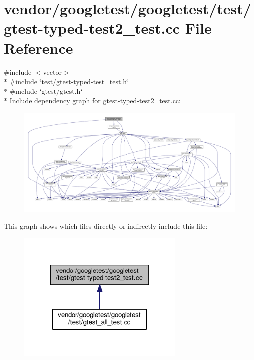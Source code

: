 \hypertarget{gtest-typed-test2__test_8cc}{}\section{vendor/googletest/googletest/test/gtest-\/typed-\/test2\+\_\+test.cc File Reference}
\label{gtest-typed-test2__test_8cc}
{\ttfamily \#include $<$vector$>$}\\*
{\ttfamily \#include \char`\"{}test/gtest-\/typed-\/test\+\_\+test.\+h\char`\"{}}\\*
{\ttfamily \#include \char`\"{}gtest/gtest.\+h\char`\"{}}\\*
Include dependency graph for gtest-\/typed-\/test2\+\_\+test.cc\+:
\nopagebreak
\begin{figure}[H]
\begin{center}
\leavevmode
\includegraphics[width=350pt]{gtest-typed-test2__test_8cc__incl}
\end{center}
\end{figure}
This graph shows which files directly or indirectly include this file\+:
\nopagebreak
\begin{figure}[H]
\begin{center}
\leavevmode
\includegraphics[width=228pt]{gtest-typed-test2__test_8cc__dep__incl}
\end{center}
\end{figure}
